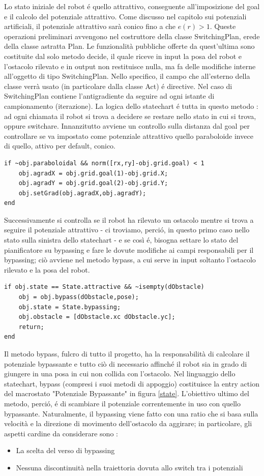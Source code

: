 \documentclass[14pt,a4paper]{extarticle}
\begin{document}
Lo stato iniziale del robot é quello attrattivo, conseguente all'imposizione del goal e il calcolo del potenziale attrattivo. Come discusso nel capitolo sui potenziali artificiali, il potenziale attrattivo sarà conico fino a che \(e(r) > 1\). Queste operazioni preliminari avvengono nel costruttore della classe SwitchingPlan, erede della classe astratta Plan. Le funzionalità pubbliche offerte da quest'ultima sono costituite dal solo metodo decide, il quale riceve in input la posa del robot e l'ostacolo rilevato e in output non restituisce nulla, ma fa delle modifiche interne all'oggetto di tipo SwitchingPlan. Nello specifico, il campo che all'esterno della classe verrà usato (in particolare dalla classe Act) é directive. Nel caso di SwitchingPlan contiene l'antigradiente da seguire ad ogni istante di campionamento (iterazione). La logica dello statechart é tutta in questo metodo : ad ogni chiamata il robot si trova a decidere se restare nello stato in cui si trova, oppure switchare. Innanzitutto avviene un controllo sulla distanza dal goal per controllare se va impostato come potenziale attrattivo quello paraboloide invece di quello, attivo per default, conico.
\begin{lstlisting}
if ~obj.paraboloidal && norm([rx,ry]-obj.grid.goal) < 1
	obj.agradX = obj.grid.goal(1)-obj.grid.X;
	obj.agradY = obj.grid.goal(2)-obj.grid.Y;
	obj.setGrad(obj.agradX,obj.agradY);
end
\end{lstlisting}
Successivamente si controlla se il robot ha rilevato un ostacolo mentre si trova a seguire il potenziale attrattivo - ci troviamo, perció, in questo primo caso nello stato sulla sinistra dello statechart - e se così é, bisogna settare lo stato del pianificatore su bypassing e fare le dovute modifiche ai campi responsabili per il bypassing; ciò avviene nel metodo bypass, a cui serve in input soltanto l'ostacolo rilevato e la posa del robot. 
\begin{lstlisting}
if obj.state == State.attractive && ~isempty(dObstacle)
	obj = obj.bypass(dObstacle,pose);
	obj.state = State.bypassing;
	obj.obstacle = [dObstacle.xc dObstacle.yc];
	return;
end
\end{lstlisting}

Il metodo bypass, fulcro di tutto il progetto, ha la responsabilità di calcolare il potenziale bypassante e tutto ciò di necessario affinché il robot sia in grado di giungere in una posa in cui non collida con l'ostacolo. Nel linguaggio dello statechart, bypass (compresi i suoi metodi di appoggio) costituisce la entry action del macrostato "Potenziale Bypassante" in figura \ref{state}. L'obiettivo ultimo del metodo, perció, é di scambiare il potenziale correntemente in uso con quello bypassante. Naturalmente, il bypassing viene fatto con una ratio che si basa sulla velocità e la direzione di movimento dell'ostacolo da aggirare; in particolare, gli aspetti cardine da considerare sono :
\begin{itemize}
\item La scelta del verso di bypassing
\item Nessuna discontinuità nella traiettoria dovuta allo switch tra i potenziali
\end{itemize}
\end{document}
